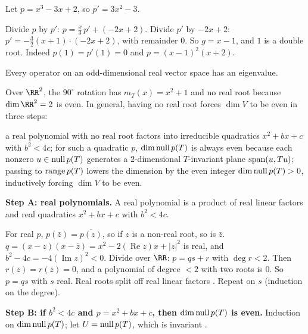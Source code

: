 \documentclass[10pt]{scrartcl}
\begin{document}
\begin{example*}
  Let $p=x^3-3x+2$, so $p'=3x^2-3$.
  \begin{steps}
    \ii Divide $p$ by $p'$: $p=\frac x3\,p'+(-2x+2)$.
    \ii Divide $p'$ by $-2x+2$: $p'=-\frac32(x+1)\cdot(-2x+2)$, with remainder $0$.
    \ii So $g=x-1$, and $1$ is a double root. Indeed $p(1)=p'(1)=0$ and $p=(x-1)^2(x+2)$.
  \end{steps}
\end{example*}

\begin{proposition*}\hypertarget{name-f11-odd-dimension-ladr-5b}{}\label{name-f11-odd-dimension-ladr-5b}
  Every operator on an odd-dimensional real vector space has an eigenvalue.
\end{proposition*}
\begin{ideabox}
Over $\RR^2$, the $90^\circ$ rotation has $m_T(x)=x^2+1$ and no real root because $\dim\RR^2=2$ is even. In general, having no real root forces $\dim V$ to be even in three steps:
\begin{enumerate}[(A)]
  \ii a real polynomial with no real root factors into irreducible quadratics $x^2+bx+c$ with $b^2<4c$;
  \ii for such a quadratic $p$, $\dim\operatorname{null} p(T)$ is always even because each nonzero $u\in\operatorname{null} p(T)$ generates a $2$-dimensional $T$-invariant plane $\operatorname{span}(u,Tu)$;
  \ii passing to $\operatorname{range} p(T)$ lowers the dimension by the even integer $\dim\operatorname{null} p(T)>0$, inductively forcing $\dim V$ to be even.
\end{enumerate}
\end{ideabox}
\textbf{Step A: real polynomials.} A real polynomial is a product of real linear factors and real quadratics $x^2+bx+c$ with $b^2<4c$.
\begin{steps}
  \ii For real $p$, $p(\bar z)=\overline{p(z)}$, so if $z$ is a non-real root, so is $\bar z$.
  \ii $q=(x-z)(x-\bar z)=x^2-2(\operatorname{Re}z)x+|z|^2$ is real, and $b^2-4c=-4(\operatorname{Im}z)^2<0$.
  \ii Divide over $\RR$: $p=qs+r$ with $\deg r<2$. Then $r(z)=r(\bar z)=0$, and a polynomial of degree $<2$ with two roots is $0$. So $p=qs$ with $s$ real. Real roots split off real linear factors . Repeat on $s$ (induction on the degree).
\end{steps}
\textbf{Step B: if $b^2<4c$ and $p=x^2+bx+c$, then $\dim\operatorname{null} p(T)$ is even.} Induction on $\dim\operatorname{null} p(T)$; let $U=\operatorname{null} p(T)$, which is invariant .
\end{document}
